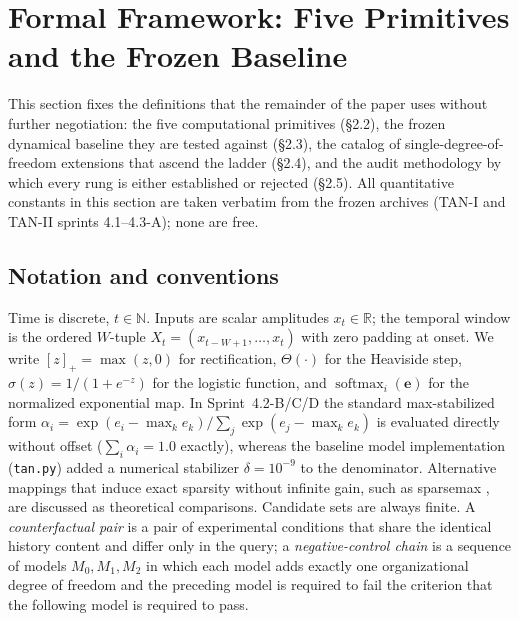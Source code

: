 \section{Formal Framework: Five Primitives and the Frozen Baseline}
\label{sec:framework}

This section fixes the definitions that the remainder of the paper uses
without further negotiation: the five computational primitives (§2.2), the
frozen dynamical baseline they are tested against (§2.3), the catalog of
single-degree-of-freedom extensions that ascend the ladder (§2.4), and the
audit methodology by which every rung is either established or rejected
(§2.5). All quantitative constants in this section are taken verbatim from
the frozen archives (TAN-I and TAN-II sprints 4.1--4.3-A); none are free.

\subsection{Notation and conventions}
\label{sec:notation}

Time is discrete, $t\in\mathbb{N}$. Inputs are scalar amplitudes
$x_t\in\mathbb{R}$; the temporal window is the ordered $W$-tuple
$X_t=(x_{t-W+1},\ldots,x_t)$ with zero padding at onset. We write
$[z]_+=\max(z,0)$ for rectification, $\Theta(\cdot)$ for the Heaviside
step, $\sigma(z)=1/(1+e^{-z})$ for the logistic function, and
$\operatorname{softmax}_i(\bm e)$ for the normalized exponential map.
In Sprint~4.2-B/C/D the standard max-stabilized form
$\alpha_i=\exp(e_i-\max_k e_k)/\sum_j\exp(e_j-\max_k e_k)$ is evaluated
directly without offset ($\sum_i\alpha_i=1.0$ exactly), whereas the baseline
model implementation (\texttt{tan.py}) added a numerical stabilizer
$\delta=10^{-9}$ to the denominator. Alternative mappings that induce exact
sparsity without infinite gain, such as sparsemax \citep{martins2016}, are
discussed as theoretical comparisons. Candidate sets are always
finite. A \emph{counterfactual pair} is a pair of experimental conditions
that share the identical history content and differ only in the query; a
\emph{negative-control chain} is a sequence of models $M_0,M_1,M_2$ in which
each model adds exactly one organizational degree of freedom and the
preceding model is required to fail the criterion that the following model
is required to pass.

